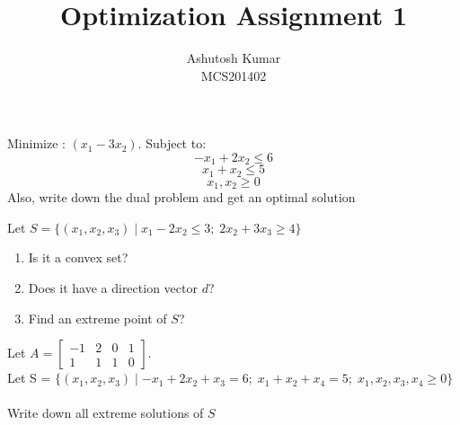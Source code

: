 \documentclass[12pt]{article}
\newenvironment{question}[2][Question]{\begin{trivlist}
\item[\hskip \labelsep {\bfseries #1}\hskip \labelsep {\bfseries #2.}]}{\end{trivlist}}
\begin{document}
 
 
\title{Optimization Assignment 1}%
\author{Ashutosh Kumar\\ %
MCS201402} %
 
\maketitle
 
\begin{question}{1} %
Minimize : $(x_1 - 3x_2)$. Subject to:
\begin{equation}\label{q1:e1}
-x_1 + 2x_2 \leq 6
\end{equation} 
\begin{equation}\label{q1:e2}
x_1 + x_2 \leq 5 
\end{equation}
\begin{equation}\label{q1:e3}
x_1,x_2 \geq 0
\end{equation}
Also, write down the dual problem and get an optimal solution
\end{question}
 
\begin{question}{2}
Let 
\(
S = \{(x_1,x_2,x_3) \mid x_1 - 2x_2 \leq 3;\; 2x_2 + 3x_3 \geq 4\}
\)
\begin{enumerate}
\item Is it a convex set? 
\item Does it have a direction vector $d$?
\item Find an extreme point of $S$?
\end{enumerate}
\end{question}
 
\begin{question}{3}
Let \(
 A = \begin{bmatrix}
 -1 & 2 & 0 & 1 \\
 1 & 1 & 1 & 0
 \end{bmatrix}
 \).
 \\ Let S = \( \{(x_1,x_2,x_3) \mid -x_1 + 2x_2 +x_3 = 6;\; x_1+x_2 +x_4=5;\; x_1,x_2,x_3,x_4 \geq 0\} \)\\ \\
Write down all extreme solutions of $S$
\end{question}
 
 
\end{document}

